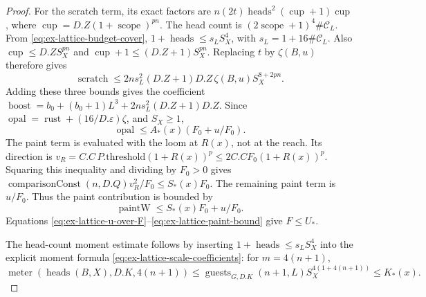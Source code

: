 \begin{proof}
For the scratch term, its exact factors are
\(n(2t)\operatorname{heads}^2(\operatorname{cup}+1)\operatorname{cup}\),
where \(\operatorname{cup}=D.Z(1+\operatorname{scope})^{pn}\).
The head count is
\((2\operatorname{scope}+1)^4\#\mathcal C_L\). From \eqref{eq:ex-lattice-budget-cover},
\(1+\operatorname{heads}\le s_LS_X^4\), with
\(s_L=1+16\#\mathcal C_L\).
Also \(\operatorname{cup}\le D.ZS_X^{pn}\) and
\(\operatorname{cup}+1\le(D.Z+1)S_X^{pn}\). Replacing \(t\) by
\(\zeta(B,u)\) therefore gives
\[
 \operatorname{scratch}\le
 2n s_L^2(D.Z+1)D.Z\,\zeta(B,u)S_X^{8+2pn}.
\]
Adding these three bounds gives the coefficient
\(\operatorname{boost}=b_0+(b_0+1)L^3+2n s_L^2(D.Z+1)D.Z\).
Since \(\operatorname{opal}=\operatorname{rust}+(16/D.\varepsilon)\zeta\),
and \(S_X\ge1\),
\begin{equation}
 \operatorname{opal}\le A_*(x)(F_0+u/F_0).
 \label{eq:ex-lattice-opal-bound}
\end{equation}
The paint term is evaluated with the loom at \(R(x)\), not at the reach.
Its direction is
\(v_R=C.C\,P.\mathrm{threshold}(1+R(x))^p\le
2C.CF_0(1+R(x))^p\). Squaring this inequality and dividing by \(F_0>0\)
gives \(\operatorname{comparisonConst}(n,D.Q)v_R^2/F_0\le S_*(x)F_0\).
The remaining paint term is \(u/F_0\). Thus the paint contribution is bounded by
\begin{equation}
 \operatorname{paintW}\le S_*(x)F_0+u/F_0.
 \label{eq:ex-lattice-paint-bound}
\end{equation}
Equations \eqref{eq:ex-lattice-u-over-F}--\eqref{eq:ex-lattice-paint-bound} give \(F\le U_*\).

The head-count moment estimate follows by inserting
\(1+\operatorname{heads}\le s_LS_X^4\) into the explicit moment formula
\eqref{eq:ex-lattice-scale-coefficients}: for \(m=4(n+1)\),
\begin{equation}
 \operatorname{meter}(\operatorname{heads}(B,X),D.K,4(n+1))
 \le \operatorname{guests}_{G,D.K}(n+1,L)S_X^{4(1+4(n+1))}
 \le K_*(x).
 \label{eq:ex-lattice-head-moment}
\end{equation}


\end{proof}
